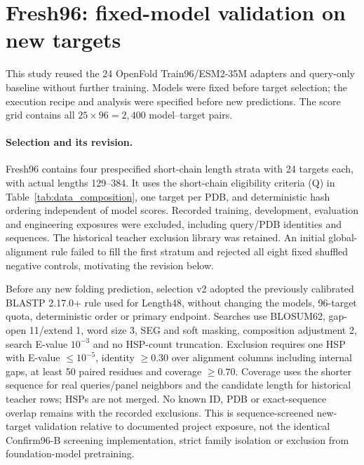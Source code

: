 


\section{Fresh96: fixed-model validation on new targets}
\label{app:fresh96}
This study reused the 24 OpenFold Train96/ESM2-35M adapters and query-only
baseline without further training. Models were fixed before target selection;
the execution recipe and analysis were specified before new predictions.
The score grid contains all $25\times96=2,400$ model--target pairs.

\paragraph{Selection and its revision.}
Fresh96 contains four prespecified short-chain length strata with 24 targets
each, with actual lengths 129--384. It uses the short-chain eligibility criteria
(Q) in Table~\ref{tab:data_composition}, one target per PDB, and deterministic
hash ordering independent of model scores. Recorded training, development,
evaluation and engineering exposures were excluded, including query/PDB
identities and sequences. The historical teacher exclusion library was retained.
An initial global-alignment rule failed to fill the first stratum and rejected
all eight fixed shuffled negative controls, motivating the revision below.

Before any new folding prediction, selection v2 adopted the previously
calibrated BLASTP 2.17.0+ rule used for Length48, without changing the models,
96-target quota, deterministic order or primary endpoint. Searches use BLOSUM62,
gap-open 11/extend 1, word size 3, SEG and soft masking, composition adjustment
2, search E-value $10^{-3}$ and no HSP-count truncation. Exclusion requires one
HSP with E-value $\leq10^{-5}$, identity $\geq0.30$ over alignment columns
including internal gaps, at least 50 paired residues and coverage $\geq0.70$.
Coverage uses the shorter sequence for real queries/panel neighbors and the
candidate length for historical teacher rows; HSPs are not merged. No known
ID, PDB or exact-sequence overlap remains with the recorded exclusions. This
is sequence-screened new-target validation relative to documented project
exposure, not the identical Confirm96-B screening implementation, strict
family isolation or exclusion from foundation-model pretraining.

